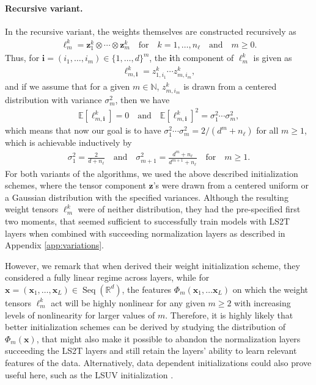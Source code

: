 \documentclass{article} \usepackage{iclr2021_conference,times}
\newcommand{\R}{\mathbb{R}}
\newcommand{\bx}{\mathbf{x}}
\newcommand{\bz}{\mathbf{z}}
\newcommand{\NN}{\mathbb{N}}
\newcommand{\EE}{\mathbb{E}}
\newcommand{\Seq}[1]{\operatorname{Seq}(#1)}
\theoremstyle{plain}
\theoremstyle{definition}
\begin{document}
\paragraph{Recursive variant.} In the recursive variant, the weights themselves are constructed recursively as
\begin{align}
    \ell^k_m = \bz^k_1 \otimes \cdots \otimes \bz^k_m \quad\text{for}\quad k=1,\dots,n_\ell \quad\text{and}\quad m \geq 0.
\end{align}
Thus, for $\mathbf{i} = (i_1, \dots, i_m) \in \{1, \dots, d\}^m$, the $\mathbf{i}$th component of $\ell^k_m$ is given as
\begin{align}
    \ell^k_{m, \mathbf{i}} = z^k_{1, i_1} \cdots z^k_{m, i_m},
\end{align}
and if we assume that for a given $m \in \NN$, $z^k_{m, i_m}$ is drawn from a centered distribution with variance $\sigma_m^2$, then we have
\begin{align}
    \EE[\ell^k_{m, \mathbf{i}}] = 0 \quad\text{and}\quad \EE[\ell^k_{m, \mathbf{i}}]^2 = \sigma_1^2 \cdots \sigma_m^2,
\end{align}
which means that now our goal is to have $\sigma_1^2 \cdots \sigma_m^2 = 2 / (d^m + n_\ell)$ for all $m \geq 1$, which is achievable inductively by
\begin{align}
    \sigma_1^2 = \frac{2}{d + n_\ell} \quad\text{and}\quad \sigma_{m+1}^2 = \frac{d^m + n_\ell}{d^{m+1} + n_\ell} \quad\text{for}\quad {m \geq 1}. 
\end{align}
For both variants of the algorithms, we used the above described initialization schemes, where the tensor component $\bz$'s were drawn from a centered uniform or a Gaussian distribution with the specified variances. Although the resulting weight tensors $\ell^k_m$ were of neither distribution, they had the pre-specified first two moments, that seemed sufficient to successfully train models with LS2T layers when combined with succeeding normalization layers as described in Appendix \ref{app:variations}.

However, we remark that when \citet{glorot2010understanding} derived their weight initialization scheme, they considered a fully linear regime across layers, while for $\bx = (\bx_1, \dots, \bx_L) \in \Seq{\R^d}$, the features $\Phi_m(\bx_1, \dots \bx_L)$ on which the weight tensors $\ell^k_m$ act will be highly nonlinear for any given $m \geq 2$ with increasing levels of nonlinearity for larger values of $m$. Therefore, it is highly likely that better initialization schemes can be derived by studying the distribution of $\Phi_m(\bx)$, that might also make it possible to abandon the normalization layers succeeding the LS2T layers and still retain the layers' ability to learn relevant features of the data.
Alternatively, data dependent initializations could also prove useful here, such as the LSUV initialization \citep{mishkin2015all}.
\end{document}
